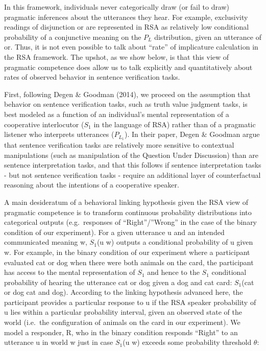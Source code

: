\documentclass[floatsintext,man]{apa6}
\theoremstyle{definition}
\theoremstyle{definition}
\theoremstyle{definition}
\theoremstyle{remark}
\begin{document}
In this framework, individuals never categorically draw (or fail to
draw) pragmatic inferences about the utterances they hear. For example,
exclusivity readings of disjunction or are represented in RSA as
relatively low conditional probability of a conjunctive meaning on the
\(P_L\) distribution, given an utterance of or. Thus, it is not even
possible to talk about \enquote{rate} of implicature calculation in the
RSA framework. The upshot, as we show below, is that this view of
pragmatic competence does allow us to talk explicitly and quantitatively
about rates of observed behavior in sentence verification tasks.

First, following Degen \& Goodman (2014), we proceed on the assumption
that behavior on sentence verification tasks, such as truth value
judgment tasks, is best modeled as a function of an individual's mental
representation of a cooperative interlocutor (\(S_1\) in the language of
RSA) rather than of a pragmatic listener who interprets utterances
(\(P_{L_1}\)). In their paper, Degen \& Goodman argue that sentence
verification tasks are relatively more sensitive to contextual
manipulations (such as manipulation of the Question Under Discussion)
than are sentence interpretation tasks, and that this follows if
sentence interpretation tasks - but not sentence verification tasks -
require an additional layer of counterfactual reasoning about the
intentions of a cooperative speaker.

A main desideratum of a behavioral linking hypothesis given the RSA view
of pragmatic competence is to transform continuous probability
distributions into categorical outputs (e.g.~responses of
\enquote{Right}/''Wrong'' in the case of the binary condition of our
experiment). For a given utterance u and an intended communicated
meaning w, \(S_1\)(u \textbar{} w) outputs a conditional probability of
u given w. For example, in the binary condition of our experiment where
a participant evaluated cat or dog when there were both animals on the
card, the participant has access to the mental representation of \(S_1\)
and hence to the \(S_1\) conditional probability of hearing the
utterance cat or dog given a dog and cat card: \(S_1\)(cat or dog
\textbar{} cat and dog). According to the linking hypothesis advanced
here, the participant provides a particular response to u if the RSA
speaker probability of u lies within a particular probability interval,
given an observed state of the world (i.e.~the configuration of animals
on the card in our experiment). We model a responder, R, who in the
binary condition responds \enquote{Right} to an utterance u in world w
just in case \(S_1\)(u \textbar{} w) exceeds some probability threshold
\(\theta\):
\end{document}
